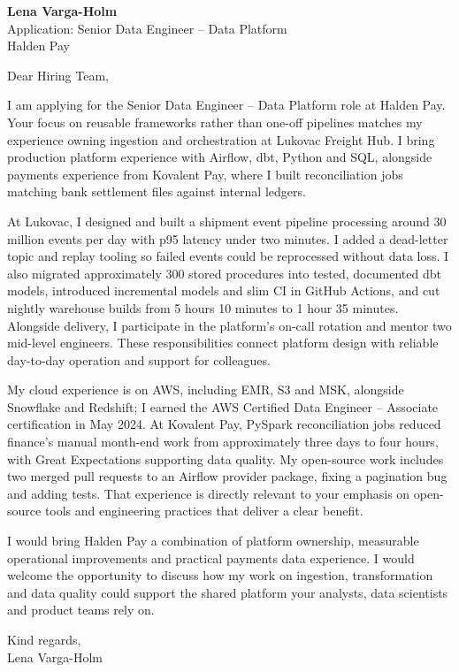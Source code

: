 \documentclass[11pt,a4paper]{article}
\begin{document}
{\Large\bfseries\color{primarycolor} Lena Varga-Holm}\\
Application: Senior Data Engineer – Data Platform\\
Halden Pay

Dear Hiring Team,

I am applying for the Senior Data Engineer – Data Platform role at Halden Pay. Your focus on reusable frameworks rather than one-off pipelines matches my experience owning ingestion and orchestration at Lukovac Freight Hub. I bring production platform experience with Airflow, dbt, Python and SQL, alongside payments experience from Kovalent Pay, where I built reconciliation jobs matching bank settlement files against internal ledgers.

At Lukovac, I designed and built a shipment event pipeline processing around 30 million events per day with p95 latency under two minutes. I added a dead-letter topic and replay tooling so failed events could be reprocessed without data loss. I also migrated approximately 300 stored procedures into tested, documented dbt models, introduced incremental models and slim CI in GitHub Actions, and cut nightly warehouse builds from 5 hours 10 minutes to 1 hour 35 minutes. Alongside delivery, I participate in the platform's on-call rotation and mentor two mid-level engineers. These responsibilities connect platform design with reliable day-to-day operation and support for colleagues.

My cloud experience is on AWS, including EMR, S3 and MSK, alongside Snowflake and Redshift; I earned the AWS Certified Data Engineer – Associate certification in May 2024. At Kovalent Pay, PySpark reconciliation jobs reduced finance's manual month-end work from approximately three days to four hours, with Great Expectations supporting data quality. My open-source work includes two merged pull requests to an Airflow provider package, fixing a pagination bug and adding tests. That experience is directly relevant to your emphasis on open-source tools and engineering practices that deliver a clear benefit.

I would bring Halden Pay a combination of platform ownership, measurable operational improvements and practical payments data experience. I would welcome the opportunity to discuss how my work on ingestion, transformation and data quality could support the shared platform your analysts, data scientists and product teams rely on.

Kind regards,\\
Lena Varga-Holm
\end{document}
